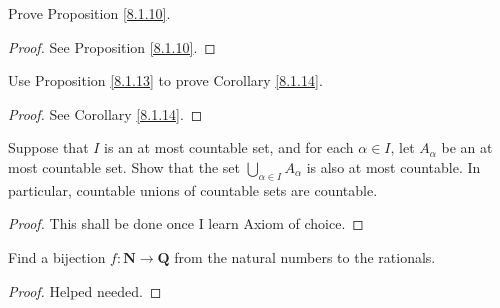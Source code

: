 \begin{exercise}\label{ex 8.1.7}
Prove Proposition \ref{8.1.10}.
\end{exercise}

\begin{proof}
See Proposition \ref{8.1.10}.
\end{proof}

\begin{exercise}\label{ex 8.1.8}
Use Proposition \ref{8.1.13} to prove Corollary \ref{8.1.14}.
\end{exercise}

\begin{proof}
See Corollary \ref{8.1.14}.
\end{proof}

\begin{exercise}\label{ex 8.1.9}
Suppose that \(I\) is an at most countable set, and for each \(\alpha \in I\), let \(A_{\alpha}\) be an at most countable set.
Show that the set \(\bigcup_{\alpha \in I} A_{\alpha}\) is also at most countable.
In particular, countable unions of countable sets are countable.
\end{exercise}

\begin{proof}
This shall be done once I learn Axiom of choice.
\end{proof}

\begin{exercise}\label{ex 8.1.10}
Find a bijection \(f : \mathbf{N} \to \mathbf{Q}\) from the natural numbers to the rationals.
\end{exercise}

\begin{proof}
Helped needed.
\end{proof}